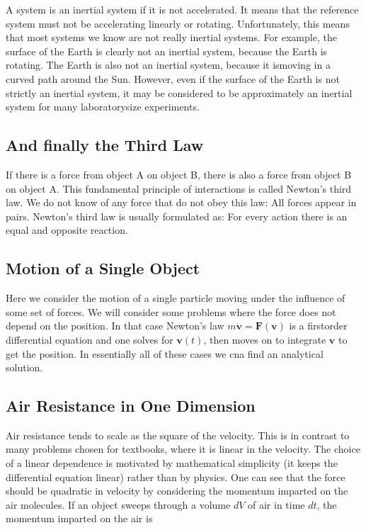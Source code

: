 \documentclass[letterpaper,10pt,english]{sphinxmanual}
\begin{document}
A system is an inertial system if it is not accelerated. It means that the reference system
must not be accelerating linearly or rotating. Unfortunately, this means that most
systems we know are not really inertial systems. For example, the surface of the
Earth is clearly not an inertial system, because the Earth is rotating. The Earth is also
not an inertial system, because it ismoving in a curved path around the Sun. However,
even if the surface of the Earth is not strictly an inertial system, it may be considered
to be approximately an inertial system for many laboratory\sphinxhyphen{}size experiments.


\subsection{And finally the Third Law}
\label{\detokenize{chapter2:and-finally-the-third-law}}
If there is a force from object A on object B, there is also a force from object B on object A.
This fundamental principle of interactions is called Newton’s third law. We do not
know of any force that do not obey this law: All forces appear in pairs. Newton’s
third law is usually formulated as: For every action there is an equal and opposite
reaction.


\subsection{Motion of a Single Object}
\label{\detokenize{chapter2:motion-of-a-single-object}}
Here we consider the motion of a single particle moving under
the influence of some set of forces.  We will consider some problems where
the force does not depend on the position. In that case Newton’s law
\(m\dot{\boldsymbol{v}}=\boldsymbol{F}(\boldsymbol{v})\) is a first\sphinxhyphen{}order differential
equation and one solves for \(\boldsymbol{v}(t)\), then moves on to integrate
\(\boldsymbol{v}\) to get the position. In essentially all of these cases we cna find an analytical solution.


\subsection{Air Resistance in One Dimension}
\label{\detokenize{chapter2:air-resistance-in-one-dimension}}
Air resistance tends to scale as the square of the velocity. This is
in contrast to many problems chosen for textbooks, where it is linear
in the velocity. The choice of a linear dependence is motivated by
mathematical simplicity (it keeps the differential equation linear)
rather than by physics. One can see that the force should be quadratic
in velocity by considering the momentum imparted on the air
molecules. If an object sweeps through a volume \(dV\) of air in time
\(dt\), the momentum imparted on the air is
\end{document}
